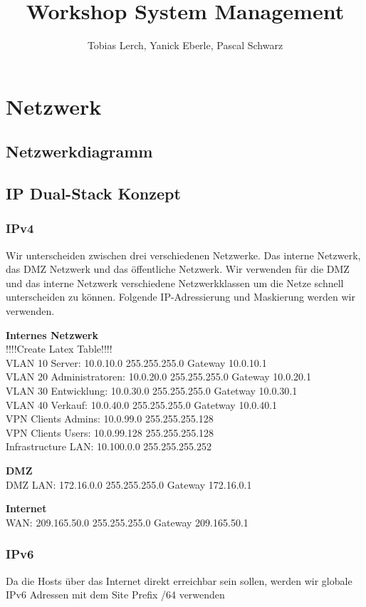 \documentclass[11pt,a4paper,parskip=half]{scrartcl}
\title{Workshop System Management}
\author{Tobias Lerch, Yanick Eberle, Pascal Schwarz}
\begin{document}
\maketitle
\newpage

\section{Netzwerk}
\subsection{Netzwerkdiagramm}
\subsection{IP Dual-Stack Konzept}
\subsubsection{IPv4}
Wir unterscheiden zwischen drei verschiedenen Netzwerke. Das interne Netzwerk, das DMZ Netzwerk und das öffentliche Netzwerk. Wir verwenden für die DMZ und das interne Netzwerk verschiedene Netzwerkklassen um die Netze schnell unterscheiden zu können. Folgende IP-Adressierung und Maskierung werden wir verwenden.

\textbf{Internes Netzwerk}\\
!!!!Create Latex Table!!!!\\
VLAN 10 Server: 10.0.10.0 255.255.255.0 Gateway 10.0.10.1\\
VLAN 20 Administratoren: 10.0.20.0 255.255.255.0 Gateway 10.0.20.1\\
VLAN 30 Entwicklung: 10.0.30.0 255.255.255.0 Gatetway 10.0.30.1\\
VLAN 40 Verkauf: 10.0.40.0 255.255.255.0 Gatetway 10.0.40.1\\
VPN Clients Admins: 10.0.99.0 255.255.255.128\\
VPN Clients Users: 10.0.99.128 255.255.255.128\\
Infrastructure LAN: 10.100.0.0 255.255.255.252

\textbf{DMZ}\\
DMZ LAN: 172.16.0.0 255.255.255.0 Gateway 172.16.0.1

\textbf{Internet}\\
WAN: 209.165.50.0 255.255.255.0 Gateway 209.165.50.1

\subsubsection{IPv6}
Da die Hosts über das Internet direkt erreichbar sein sollen, werden wir globale IPv6 Adressen mit dem Site Prefix /64 verwenden
\end{document}
